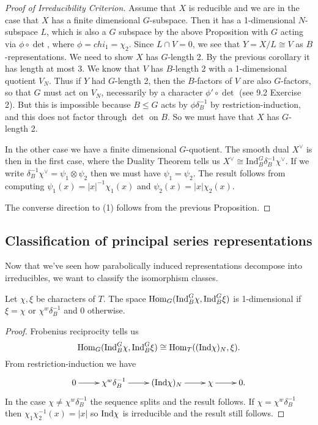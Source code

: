 \begin{proof}[Proof of Irreducibility Criterion]
    Assume that $X$ is reducible and we are in the case that $X$ has a finite dimensional $G$-subspace. Then it has a 1-dimensional $N$-subspace $L$, which is also a $G$ subspace by the above Proposition with $G$ acting via $\phi \circ \det$, where $\phi=chi_1=\chi_2$. Since $L \cap V =0$, we see that $Y=X/L \cong V$ as $B$-representations. We need to show $X$ has $G$-length 2. By the previous corollary it has length at most 3. We know that $V$ has $B$-length 2 with a 1-dimensional quotient $V_N$. Thus if $Y$ had $G$-length 2, then the $B$-factors of $V$ are also $G$-factors, so that $G$ must act on $V_N$, necessarily by a character $\phi' \circ \det$ (see 9.2 Exercise 2). But this is impossible because $B \leq G$ acts by $\phi \delta_B^{-1}$ by restriction-induction, and this does not factor through $\det$ on $B$. So we must have that $X$ has $G$-length 2.

    In the other case we have a finite dimensional $G$-quotient. The smooth dual $X^\vee$ is then in the first case, where the Duality Theorem tells us $X^\vee \cong \mathrm{Ind}_B^G \delta_B^{-1} \chi^\vee$. If we write $\delta_B^{-1} \chi^\vee = \psi_1 \otimes \psi_2$ then we must have $\psi_1 = \psi_2$. The result follows from computing $\psi_1(x) = |x|^{-1} \chi_1(x)$ and $\psi_2(x) = |x| \chi_2(x)$.

    The converse direction to (1) follows from the previous Proposition.
\end{proof}


\subsection{Classification of principal series representations}


Now that we've seen how parabolically induced representations decompose into irreducibles, we want to classify the isomorphism classes.

\begin{prop}
    Let $\chi, \xi$ be characters of $T$. The space $\mathrm{Hom}_G(\mathrm{Ind}_B^G \chi, \mathrm{Ind}_B^G \xi)$ is 1-dimensional if $\xi = \chi$ or $\chi^w \delta_B^{-1}$ and 0 otherwise.
\end{prop}
\begin{proof}
    Frobenius reciprocity tells us
    $$\mathrm{Hom}_G(\mathrm{Ind}_B^G \chi, \mathrm{Ind}_B^G \xi) \cong \mathrm{Hom}_T((\mathrm{Ind} \chi)_N, \xi).$$
    From restriction-induction we have
    $$\xymatrix{0 \ar[r] & \chi^w \delta_B^{-1} \ar[r] & (\Ind \chi)_N \ar[r] & \chi \ar[r] & 0.}$$
    In the case $\chi \neq \chi^w \delta_B^{-1}$ the sequence splits and the result follows. If $\chi = \chi^w \delta_B^{-1}$ then $\chi_1\chi_2^{-1} (x) = |x|$ so $\mathrm{Ind} \chi$ is irreducible and the result still follows.
\end{proof}

